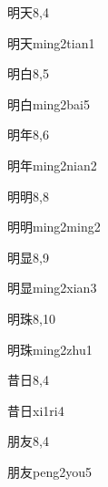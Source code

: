 \begin{entry}{明天}{8,4}
  \begin{phonetics}{明天}{ming2tian1}
  \end{phonetics}
\end{entry}

\begin{entry}{明白}{8,5}
  \begin{phonetics}{明白}{ming2bai5}
  \end{phonetics}
\end{entry}

\begin{entry}{明年}{8,6}
  \begin{phonetics}{明年}{ming2nian2}
  \end{phonetics}
\end{entry}

\begin{entry}{明明}{8,8}
  \begin{phonetics}{明明}{ming2ming2}
  \end{phonetics}
\end{entry}

\begin{entry}{明显}{8,9}
  \begin{phonetics}{明显}{ming2xian3}
  \end{phonetics}
\end{entry}

\begin{entry}{明珠}{8,10}
  \begin{phonetics}{明珠}{ming2zhu1}
  \end{phonetics}
\end{entry}

\begin{entry}{昔日}{8,4}
  \begin{phonetics}{昔日}{xi1ri4}
  \end{phonetics}
\end{entry}

\begin{entry}{朋友}{8,4}
  \begin{phonetics}{朋友}{peng2you5}
  \end{phonetics}
\end{entry}

